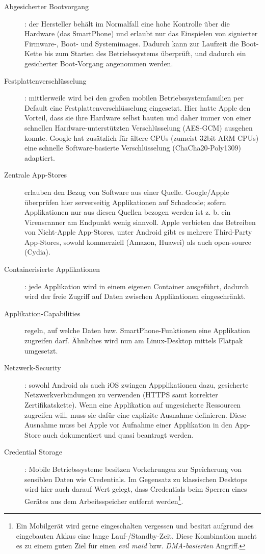 \begin{description}
	\item[Abgesicherter Bootvorgang]: der Hersteller behält im Normalfall eine hohe Kontrolle über die Hardware (das SmartPhone) und erlaubt nur das Einspielen von signierter Firmware-, Boot- und Systemimages. Dadurch kann zur Laufzeit die Boot-Kette bis zum Starten des Betriebssystems überprüft, und dadurch ein gesicherter Boot-Vorgang angenommen werden.
	\item[Festplattenverschlüsselung]: mittlerweile wird bei den großen mobilen Betriebssystemfamilien per Default eine Festplattenverschlüsselung eingesetzt. Hier hatte Apple den Vorteil, dass sie ihre Hardware selbst bauten und daher immer von einer schnellen Hardware-unterstützten Verschlüsselung (AES-GCM) ausgehen konnte. Google hat zusätzlich für ältere CPUs (zumeist 32bit ARM CPUs) eine schnelle Software-basierte Verschlüsselung (ChaCha20-Poly1309) adaptiert.
	\item[Zentrale App-Stores] erlauben den Bezug von Software aus einer Quelle. Google/Apple überprüfen hier serverseitig Applikationen auf Schadcode; sofern Applikationen nur aus diesen Quellen bezogen werden ist z. b. ein Virenscanner am Endpunkt wenig sinnvoll. Apple verbieten das Betreiben von Nicht-Apple App-Stores, unter Android gibt es mehrere Third-Party App-Stores, sowohl kommerziell (Amazon, Huawei) als auch open-source (Cydia).
	\item[Containerisierte Applikationen]: jede Applikation wird in einem eigenen Container ausgeführt, dadurch wird der freie Zugriff auf Daten zwischen Applikationen eingeschränkt.
	\item[Applikation-Capabilities] regeln, auf welche Daten bzw. SmartPhone-Funktionen eine Applikation zugreifen darf. Ähnliches wird nun am Linux-Desktop mittels Flatpak umgesetzt.
	\item[Netzwerk-Security]: sowohl Android als auch iOS zwingen Appplikationen dazu, gesicherte Netzwerkverbindungen zu verwenden (HTTPS samt korrekter Zertifikatskette). Wenn eine Applikation auf ungesicherte Ressourcen zugreifen will, muss sie dafür eine explizite Ausnahme definieren. Diese Ausnahme muss bei Apple vor Aufnahme einer Applikation in den App-Store auch dokumentiert und quasi beantragt werden.
	\item[Credential Storage]: Mobile Betriebssysteme besitzen Vorkehrungen zur Speicherung von sensiblen Daten wie Credentials. Im Gegensatz zu klassischen Desktops wird hier auch darauf Wert gelegt, dass Credentials beim Sperren eines Gerätes aus dem Arbeitsspeicher entfernt werden\footnote{Ein Mobilgerät wird gerne eingeschalten vergessen und besitzt aufgrund des eingebauten Akkus eine lange Lauf-/Standby-Zeit. Diese Kombination macht es zu einem guten Ziel für einen \textit{evil maid} bzw. \textit{DMA-basierten} Angriff.}.

\end{description}
